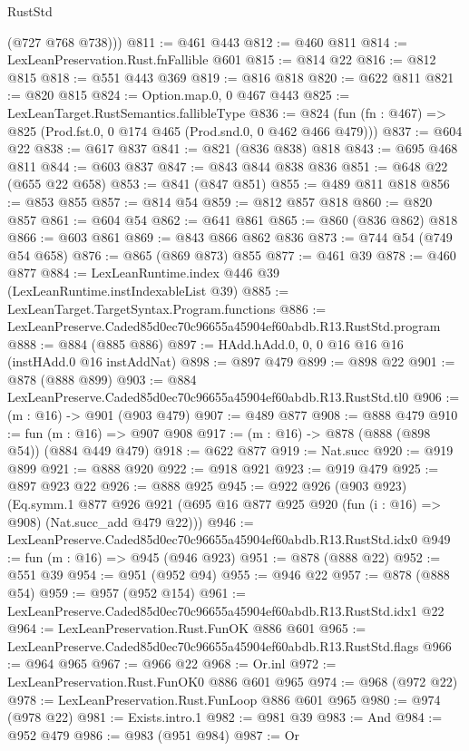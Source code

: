 \begin{lexlean}{RustStd}
\begin{coremodule}
        (@727 @768 @738)))
@811 := @461 @443
@812 := @460 @811
@814 := LexLeanPreservation.Rust.fnFallible @601
@815 := @814 @22
@816 := @812 @815
@818 := @551 @443 @369
@819 := @816 @818
@820 := @622 @811
@821 := @820 @815
@824 := Option.map.{0, 0} @467 @443
@825 := LexLeanTarget.RustSemantics.fallibleType
@836 := @824 (fun (fn : @467) => @825 (Prod.fst.{0, 0} @174 @465 (Prod.snd.{0, 0} @462 @466 @479)))
@837 := @604 @22
@838 := @617 @837
@841 := @821 (@836 @838) @818
@843 := @695 @468 @811
@844 := @603 @837
@847 := @843 @844 @838 @836
@851 := @648 @22 (@655 @22 @658)
@853 := @841 (@847 @851)
@855 := @489 @811 @818
@856 := @853 @855
@857 := @814 @54
@859 := @812 @857 @818
@860 := @820 @857
@861 := @604 @54
@862 := @641 @861
@865 := @860 (@836 @862) @818
@866 := @603 @861
@869 := @843 @866 @862 @836
@873 := @744 @54 (@749 @54 @658)
@876 := @865 (@869 @873) @855
@877 := @461 @39
@878 := @460 @877
@884 := LexLeanRuntime.index @446 @39 (LexLeanRuntime.instIndexableList @39)
@885 := LexLeanTarget.TargetSyntax.Program.functions
@886 := LexLeanPreserve.Caded85d0ec70c96655a45904ef60abdb.R13.RustStd.program
@888 := @884 (@885 @886)
@897 := HAdd.hAdd.{0, 0, 0} @16 @16 @16 (instHAdd.{0} @16 instAddNat)
@898 := @897 @479
@899 := @898 @22
@901 := @878 (@888 @899)
@903 := @884 LexLeanPreserve.Caded85d0ec70c96655a45904ef60abdb.R13.RustStd.tl0
@906 := (m : @16) -> @901 (@903 @479)
@907 := @489 @877
@908 := @888 @479
@910 := fun (m : @16) => @907 @908
@917 := (m : @16) -> @878 (@888 (@898 @54)) (@884 @449 @479)
@918 := @622 @877
@919 := Nat.succ
@920 := @919 @899
@921 := @888 @920
@922 := @918 @921
@923 := @919 @479
@925 := @897 @923 @22
@926 := @888 @925
@945 := @922
    @926
    (@903 @923)
    (Eq.symm.{1}
      @877
      @926
      @921
      (@695 @16 @877 @925 @920 (fun (i : @16) => @908) (Nat.succ_add @479 @22)))
@946 := LexLeanPreserve.Caded85d0ec70c96655a45904ef60abdb.R13.RustStd.idx0
@949 := fun (m : @16) => @945 (@946 @923)
@951 := @878 (@888 @22)
@952 := @551 @39
@954 := @951 (@952 @94)
@955 := @946 @22
@957 := @878 (@888 @54)
@959 := @957 (@952 @154)
@961 := LexLeanPreserve.Caded85d0ec70c96655a45904ef60abdb.R13.RustStd.idx1 @22
@964 := LexLeanPreservation.Rust.FunOK @886 @601
@965 := LexLeanPreserve.Caded85d0ec70c96655a45904ef60abdb.R13.RustStd.flags
@966 := @964 @965
@967 := @966 @22
@968 := Or.inl
@972 := LexLeanPreservation.Rust.FunOK0 @886 @601 @965
@974 := @968 (@972 @22)
@978 := LexLeanPreservation.Rust.FunLoop @886 @601 @965
@980 := @974 (@978 @22)
@981 := Exists.intro.{1}
@982 := @981 @39
@983 := And
@984 := @952 @479
@986 := @983 (@951 @984)
@987 := Or

\end{coremodule}
\end{lexlean}
